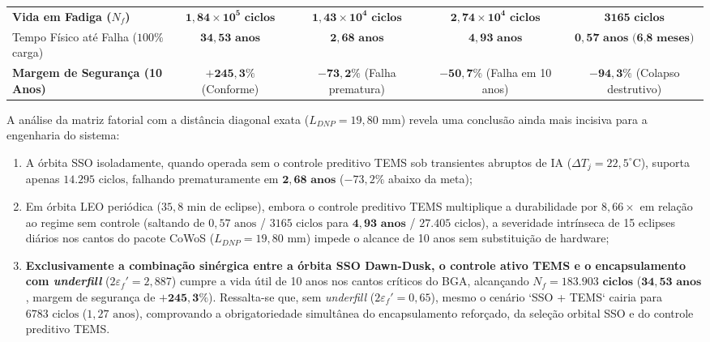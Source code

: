 \begin{table}[!ht]
{\begin{tabular}{lcccc}
\textbf{Vida em Fadiga ($N_f$)} & $\mathbf{1{,}84 \times 10^5\text{ ciclos}}$ & $\mathbf{1{,}43 \times 10^4\text{ ciclos}}$ & $\mathbf{2{,}74 \times 10^4\text{ ciclos}}$ & $\mathbf{3165\text{ ciclos}}$ \\
Tempo Físico até Falha ($100\%$ carga) & $\mathbf{34{,}53\text{ anos}}$ & $\mathbf{2{,}68\text{ anos}}$ & $\mathbf{4{,}93\text{ anos}}$ & $\mathbf{0{,}57\text{ anos (6,8 meses)}}$ \\
\textbf{Margem de Segurança (10 Anos)} & $\mathbf{+245{,}3\%}$ (Conforme) & $\mathbf{-73{,}2\%}$ (Falha prematura) & $\mathbf{-50{,}7\%}$ (Falha em 10 anos) & $\mathbf{-94{,}3\%}$ (Colapso destrutivo) \\ \hline
\end{tabular}%
}
\end{table}

A análise da matriz fatorial com a distância diagonal exata ($L_{DNP} = 19{,}80\text{ mm}$) revela uma conclusão ainda mais incisiva para a engenharia do sistema:
\begin{enumerate}[label=(\alph*)]
    \item A órbita SSO isoladamente, quando operada sem o controle preditivo TEMS sob transientes abruptos de IA ($\Delta T_j = 22{,}5^\circ\text{C}$), suporta apenas $14.295\text{ ciclos}$, falhando prematuramente em $\mathbf{2{,}68\text{ anos}}$ ($-73{,}2\%$ abaixo da meta);
    \item Em órbita LEO periódica ($35{,}8\text{ min}$ de eclipse), embora o controle preditivo TEMS multiplique a durabilidade por $8{,}66\times$ em relação ao regime sem controle (saltando de $0{,}57\text{ anos}$ / $3165\text{ ciclos}$ para $\mathbf{4{,}93\text{ anos}}$ / $27.405\text{ ciclos}$), a severidade intrínseca de 15 eclipses diários nos cantos do pacote CoWoS ($L_{DNP}=19{,}80\text{ mm}$) impede o alcance de 10 anos sem substituição de hardware;
    \item \textbf{Exclusivamente a combinação sinérgica entre a órbita SSO Dawn-Dusk, o controle ativo TEMS e o encapsulamento com \textit{underfill}} ($2\varepsilon_f'=2{,}887$) cumpre a vida útil de 10 anos nos cantos críticos do BGA, alcançando $N_f = \mathbf{183.903\text{ ciclos}}$ ($\mathbf{34{,}53\text{ anos}}$, margem de segurança de $\mathbf{+245{,}3\%}$). Ressalta-se que, sem \textit{underfill} ($2\varepsilon_f'=0{,}65$), mesmo o cenário `SSO + TEMS` cairia para $6783\text{ ciclos}$ ($1{,}27\text{ anos}$), comprovando a obrigatoriedade simultânea do encapsulamento reforçado, da seleção orbital SSO e do controle preditivo TEMS.
\end{enumerate}

